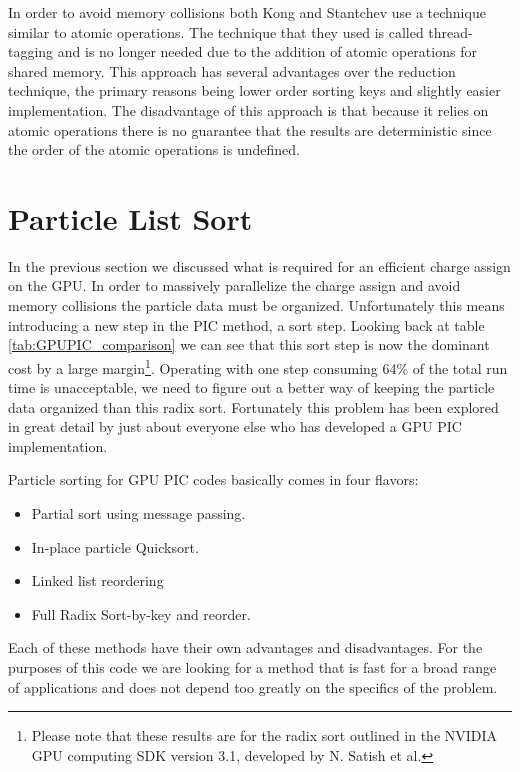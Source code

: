 In order to avoid memory collisions both Kong and Stantchev use a technique similar to atomic operations. The technique that they used is called thread-tagging and is no longer needed due to the addition of atomic operations for shared memory.\cite{Stantchev2008}\cite{Kong2011} This approach has several advantages over the reduction technique, the primary reasons being lower order sorting keys and slightly easier implementation. The disadvantage of this approach is that because it relies on atomic operations there is no guarantee that the results are deterministic since the order of the atomic operations is undefined. 







	\section{Particle List Sort}
		In the previous section we discussed what is required for an efficient charge assign on the GPU. In order to massively parallelize the charge assign and avoid memory collisions the particle data must be organized. Unfortunately this means introducing a new step in the PIC method, a sort step. Looking back at table \ref{tab:GPUPIC_comparison} we can see that this sort step is now the dominant cost by a large margin\footnote{Please note that these results are for the radix sort outlined in the NVIDIA GPU computing SDK version 3.1, developed by N. Satish et al.\cite{Satish2009}}. Operating with one step consuming 64\% of the total run time is unacceptable, we need to figure out a better way of keeping the particle data organized than this radix sort. Fortunately this problem has been explored in great detail by just about everyone else who has developed a GPU PIC implementation. 

Particle sorting for GPU PIC codes basically comes in four flavors:
\begin{itemize}
\item Partial sort using message passing. \cite{Kong2011}\cite{Decyk2011}
\item In-place particle Quicksort. \cite{Stantchev2008}
\item Linked list reordering \cite{Burau2010}
\item Full Radix Sort-by-key and reorder. \cite{Abreu2011}
\end{itemize}
Each of these methods have their own advantages and disadvantages. For the purposes of this code we are looking for a method that is fast for a broad range of applications and does not depend too greatly on the specifics of the problem.



